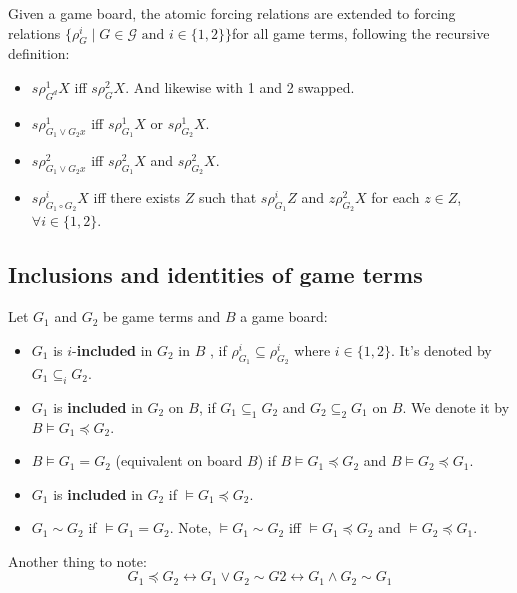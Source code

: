 \documentclass[10pt]{article}
\newcommand{\cle}{\preccurlyeq}
\begin{document}
	Given a game board, the atomic forcing relations are extended to forcing
	relations $\{\rho^i_G\mid G\in\mathcal{G} \text{ and }i\in\{1,2\} \} $for all game terms, following the recursive definition:
	\begin{itemize}
		\item $s\rho^1_{G^d}X$ iﬀ $s\rho^2_G X$. And likewise with 1 and 2 swapped.
		\item $s\rho^1_{G_1\lor G_2x}$ iﬀ $s\rho^1_{G_1}X$ or $s\rho^1_{G_2}X$.
		\item $s\rho^2_{G_1\lor G_2x}$ iﬀ $s\rho^2_{G_1}X$ and $s\rho^2_{G_2}X$.
		\item $s\rho^i_{G_1\circ G_2}X$ iﬀ there exists $Z$ such that $s\rho^i_{G_1}Z$ and $z\rho^2_{G_2}X$ for each $z \in Z$, $\forall i \in \{1,2\}$.
		
	\end{itemize}
	
	\subsection{Inclusions and identities of game terms}
	Let $G_1$ and $G_2$ be game terms and $B$ a game board:
	\begin{itemize}
		\item  $G_1$ is $i$-\textbf{included} in $G_2$ in $B$ , if $\rho^i_{G_1}\subseteq \rho^i_{G_2}$ where $i\in\{1,2\}$. It's denoted by $G_1\subseteq_i G_2$.
		
		\item $G_1$ is \textbf{included} in $G_2$ on $B$, if $G_1\subseteq_1 G_2$ and $G_2\subseteq_2 G_1$ on $B$. We denote it by $B \models G_1 \cle G_2$.
		
		\item $B \models G_1 = G_2$ (equivalent on board $B$) if $B\models G_1 \cle G_2$ and $B\models G_2 \cle G_1$.
		
		\item $G_1$ is \textbf{included} in $G_2$ if $\models G_1 \cle G_2$.
		\item $G_1\sim G_2$ if $\models G_1 = G_2$. Note, $\models G_1 \sim G_2$ iff $\models G_1 \cle G_2$  and $\models G_2 \cle G_1$.		
	\end{itemize}
	
	Another thing to note:
	\[
	G_1\cle G_2 \leftrightarrow G_1 \lor G_2 \sim G2 \leftrightarrow G_1 \land G_2 \sim G_1
	\]
	
\end{document}
